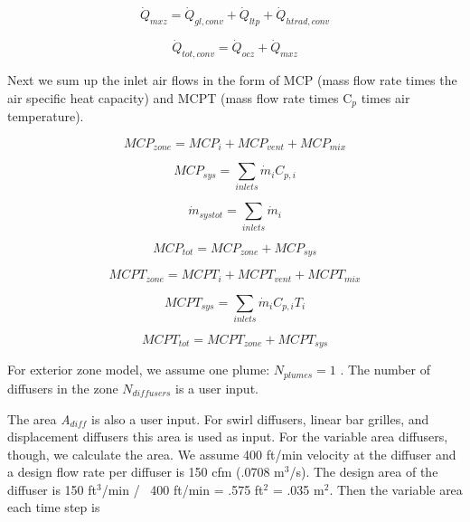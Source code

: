 \begin{equation}
{\dot Q_{mxz}} = {\dot Q_{gl,conv}} + {\dot Q_{ltp}} + {\dot Q_{htrad,conv}}
\end{equation}

\begin{equation}
{\dot Q_{tot,conv}} = {\dot Q_{ocz}} + {\dot Q_{mxz}}
\end{equation}

Next we sum up the inlet air flows in the form of MCP (mass flow rate times the air specific heat capacity) and MCPT (mass flow rate times C\(_{p}\) times air temperature).

\begin{equation}
MC{P_{zone}} = MC{P_i} + MC{P_{vent}} + MC{P_{mix}}
\end{equation}

\begin{equation}
MC{P_{sys}} = \sum\limits_{inlets} {{{\dot m}_i}} {C_{p,i}}
\end{equation}

\begin{equation}
{\dot m_{systot}} = \sum\limits_{inlets} {{{\dot m}_i}}
\end{equation}

\begin{equation}
MC{P_{tot}} = MC{P_{zone}} + MC{P_{sys}}
\end{equation}

\begin{equation}
MCP{T_{zone}} = MCP{T_i} + MCP{T_{vent}} + MCP{T_{mix}}
\end{equation}

\begin{equation}
MCP{T_{sys}} = \sum\limits_{inlets} {{{\dot m}_i}} {C_{p,i}}{T_i}
\end{equation}

\begin{equation}
MCP{T_{tot}} = MCP{T_{zone}} + MCP{T_{sys}}
\end{equation}

For exterior zone model, we assume one plume: \({N_{plumes}} = 1\) . The number of diffusers in the zone \({N_{diffusers}}\) is a user input.

The area \emph{A\(_{diff}\)} is also a user input. For swirl diffusers, linear bar grilles, and displacement diffusers this area is used as input. For the variable area diffusers, though, we calculate the area. We assume 400 ft/min velocity at the diffuser and a design flow rate per diffuser is 150 cfm (.0708 m\(^{3}\)/s). The design area of the diffuser is 150 ft\(^{3}\)/min /~ 400 ft/min = .575 ft\(^{2}\) = .035 m\(^{2}\). Then the variable area each time step is

